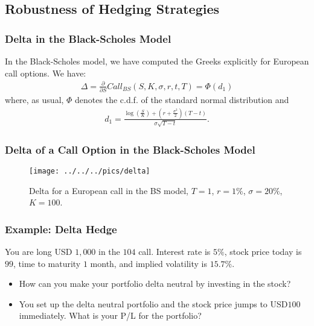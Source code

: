 \subsection{Robustness of Hedging Strategies}

\begin{frame}[fragile]
\frametitle{Delta in the Black-Scholes Model}
In the Black-Scholes model, we have computed the Greeks explicitly for
European call options. We have:
\begin{align*}
  \Delta = \frac{\partial}{\partial S}Call_{BS}(S,K,\sigma,r,t,T) = \Phi(d_1)
\end{align*}
where, as usual, $\Phi$ denotes the c.d.f. of the standard normal distribution and
\begin{align*}
  d_1 = \frac{\log \left( \frac{S}{K} \right) + \left( r + \frac{\sigma^2}{2}
  \right)(T-t)}{\sigma \sqrt{T-t}}.
\end{align*}
\end{frame}

\begin{frame}[fragile]
\frametitle{Delta of a Call Option in the Black-Scholes Model}
\begin{figure}[htp]
\begin{center}
  \texttt{[image: ../../../pics/delta]}
  \caption{Delta for a European call in the BS model, $T=1$, $r=1\%$,
  $\sigma=20\%$, $K=100$.}
  \label{fig:deltaBS}
\end{center}
\end{figure}
\end{frame}

\begin{frame}[fragile]
\frametitle{Example: Delta Hedge}
You are long USD $1,000$ in the $104$ call. Interest rate is $5\%$,
stock price today is $99$, time to maturity $1$ month, and implied volatility is
$15.7\%$.
\begin{itemize}
  \item How can you make your portfolio delta neutral by investing in the stock?
  \item You set up the delta neutral portfolio and the stock price jumps to
  USD$100$ immediately. What is your P/L for the portfolio?
\end{itemize}

\end{frame}

